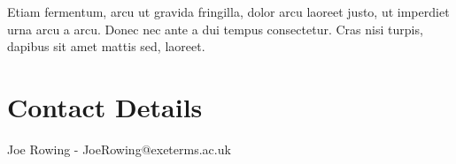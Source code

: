 \documentclass[a1,portrait]{a1poster}
\begin{document}
\begin{multicols}{2}
Etiam fermentum, arcu ut gravida fringilla, dolor arcu laoreet justo, ut imperdiet urna arcu a arcu. Donec nec ante a dui tempus consectetur. Cras nisi turpis, dapibus sit amet mattis sed, laoreet.

\section*{Contact Details}
Joe Rowing - JoeRowing@exeterms.ac.uk
\end{multicols}
\end{document}
